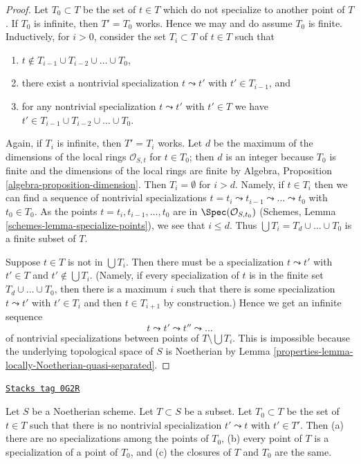 \begin{proof}

Let $T_0 \subset T$ be the set of $t \in T$ which do not specialize
to another point of $T$. If $T_0$ is infinite, then $T' = T_0$ works.
Hence we may and do assume $T_0$ is finite.
Inductively, for $i > 0$, consider the set $T_i \subset T$
of $t \in T$ such that
\begin{enumerate}
\item $t \not \in T_{i - 1} \cup T_{i - 2} \cup \ldots \cup T_0$,
\item there exist a nontrivial specialization $t \leadsto t'$ with
$t' \in T_{i - 1}$, and
\item for any nontrivial specialization
$t \leadsto t'$ with $t' \in T$ we have
$t' \in T_{i - 1} \cup T_{i - 2} \cup \ldots \cup T_0$.
\end{enumerate}
Again, if $T_i$ is infinite, then $T' = T_i$ works.
Let $d$ be the maximum of the dimensions of the local rings
$\mathcal{O}_{S, t}$ for $t \in T_0$; then $d$ is an integer
because $T_0$ is finite and the dimensions of the local rings
are finite by Algebra, Proposition \ref{algebra-proposition-dimension}.
Then $T_i = \emptyset$ for $i > d$.
Namely, if $t \in T_i$ then we can find a sequence
of nontrivial specializations
$t = t_i \leadsto t_{i - 1} \leadsto \ldots \leadsto t_0$
with $t_0 \in T_0$. As
the points $t = t_i, t_{i - 1}, \ldots, t_0$ are in
$\Spec(\mathcal{O}_{S, t_0})$
(Schemes, Lemma \ref{schemes-lemma-specialize-points}),
we see that $i \leq d$.
Thus $\bigcup T_i = T_d \cup \ldots \cup T_0$ is a finite subset of $T$.

\medskip\noindent
Suppose $t \in T$ is not in $\bigcup T_i$. Then there must be a specialization
$t \leadsto t'$ with $t' \in T$ and $t' \not \in \bigcup T_i$. (Namely, if
every specialization of $t$ is in the finite set $T_d \cup \ldots \cup T_0$,
then there is a maximum $i$ such that there is some specialization
$t \leadsto t'$ with $t' \in T_i$ and then $t \in T_{i + 1}$ by construction.)
Hence we get an infinite sequence
$$
t \leadsto t' \leadsto t'' \leadsto \ldots
$$
of nontrivial specializations between points of $T \setminus \bigcup T_i$.
This is impossible because the underlying topological space of $S$
is Noetherian by Lemma \ref{properties-lemma-locally-Noetherian-quasi-separated}.
\end{proof}

\begin{lemma}
\label{properties-lemma-maximal-points}
\href{https://stacks.math.columbia.edu/tag/0G2R}{\texttt{Stacks tag 0G2R}}

Let $S$ be a Noetherian scheme. Let $T \subset S$ be a subset. Let
$T_0 \subset T$ be the set of $t \in T$ such that there is no nontrivial
specialization $t' \leadsto t$ with $t' \in T'$. Then (a) there are
no specializations among the points of $T_0$, (b) every point of
$T$ is a specialization of a point of $T_0$, and (c) the closures
of $T$ and $T_0$ are the same.
\end{lemma}

